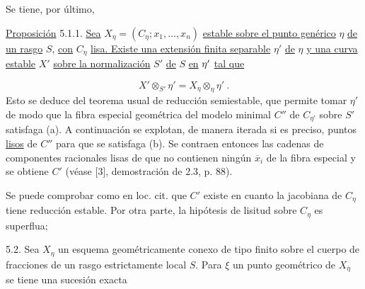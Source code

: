 Se tiene, por último,

\underline{Proposición} 5.1.1.  \underline{Sea} $X_\eta = (C_\eta ; x_1, \ldots, x_n)$ \underline{estable sobre el punto genérico} $\eta$ \underline{de un rasgo} $S$, \underline{con} $C_\eta$ \underline{lisa. Existe una extensión finita separable} $\eta'$ \underline{de} $\eta$ \underline{y una curva estable} $X'$ \underline{sobre la normalización} $S'$ \underline{de} $S$ \underline{en} $\eta'$ \underline{tal que}

\begin{equation*}
X' \otimes_{S'} \eta' = X_{\eta} \otimes_{\eta} \eta' \ .
\end{equation*}
Esto se deduce del teorema usual de reducción semiestable, que permite tomar $\eta'$ de modo que la fibra especial geométrica del modelo minimal $C''$ de $C_{\eta'}$ sobre $S'$ satisfaga (a). A continuación se explotan, de manera iterada si es preciso, puntos \underline{lisos} de $C''$ para que se satisfaga (b). Se contraen entonces las cadenas de componentes racionales lisas de  que no contienen ningún $\overline{x}_i$ de la fibra especial y se obtiene $C'$ (véase [3], demostración de 2.3, p. 88).

Se puede comprobar como en loc. cit. que $C'$ existe en cuanto la jacobiana de $C_\eta$ tiene reducción estable. Por otra parte, la hipótesis de lisitud sobre $C_\eta$ es superflua;

5.2.  Sea $X_\eta$ un esquema geométricamente conexo de tipo finito sobre el cuerpo de fracciones de un rasgo estrictamente local $S$. Para $\xi$ un punto geométrico de $X_{\overline{\eta}}$ se tiene una sucesión exacta

